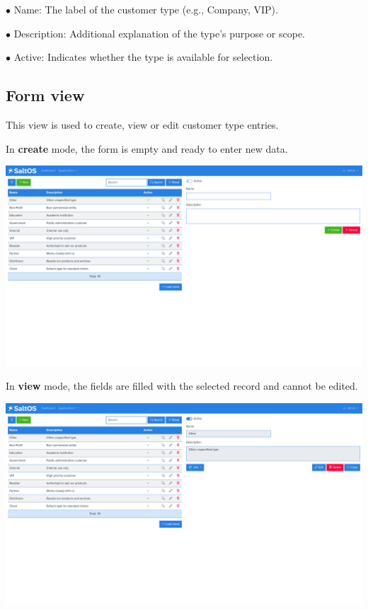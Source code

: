 \documentclass[a4paper]{article}
\begin{document}
\begin{compactitem}
\item[\color{myblue}$\bullet$] Name: The label of the customer type (e.g., Company, VIP).
\item[\color{myblue}$\bullet$] Description: Additional explanation of the type’s purpose or scope.
\item[\color{myblue}$\bullet$] Active: Indicates whether the type is available for selection.
\end{compactitem}

\hypertarget{toc54}{}
\subsection{Form view}

This view is used to create, view or edit customer type entries.

In \textbf{create} mode, the form is empty and ready to enter new data.

\begin{center}\includegraphics[width=1\textwidth]{../ujest/snaps/test-screenshots-js-screenshots-crm-customers-types-create-en-us-1-snap.png}\end{center}

In \textbf{view} mode, the fields are filled with the selected record and cannot be edited.

\begin{center}\includegraphics[width=1\textwidth]{../ujest/snaps/test-screenshots-js-screenshots-crm-customers-types-view-10-en-us-1-snap.png}\end{center}
\end{document}
